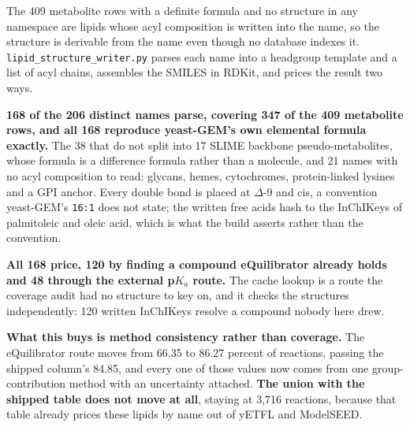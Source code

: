 The 409 metabolite rows with a definite formula and no structure in any namespace are lipids
whose acyl composition is written into the name, so the structure is derivable from the name
even though no database indexes it. \texttt{lipid\_structure\_writer.py} parses each name
into a headgroup template and a list of acyl chains, assembles the SMILES in RDKit, and
prices the result two ways.

\textbf{168 of the 206 distinct names parse, covering 347 of the 409 metabolite rows, and
all 168 reproduce yeast-GEM's own elemental formula exactly.} The 38 that do not split into
17 SLIME backbone pseudo-metabolites, whose formula is a difference formula rather than a
molecule, and 21 names with no acyl composition to read: glycans, hemes, cytochromes,
protein-linked lysines and a GPI anchor. Every double bond is placed at $\Delta$-9 and cis,
a convention yeast-GEM's \texttt{16:1} does not state; the written free acids hash to the
InChIKeys of palmitoleic and oleic acid, which is what the build asserts rather than the
convention.

\textbf{All 168 price, 120 by finding a compound eQuilibrator already holds and 48 through
the external p$K_a$ route.} The cache lookup is a route the coverage audit had no structure
to key on, and it checks the structures independently: 120 written InChIKeys resolve a
compound nobody here drew.

\textbf{What this buys is method consistency rather than coverage.} The eQuilibrator route
moves from 66.35 to 86.27 percent of reactions, passing the shipped column's 84.85, and
every one of those values now comes from one group-contribution method with an uncertainty
attached. \textbf{The union with the shipped table does not move at all}, staying at 3{,}716
reactions, because that table already prices these lipids by name out of yETFL and
ModelSEED.

